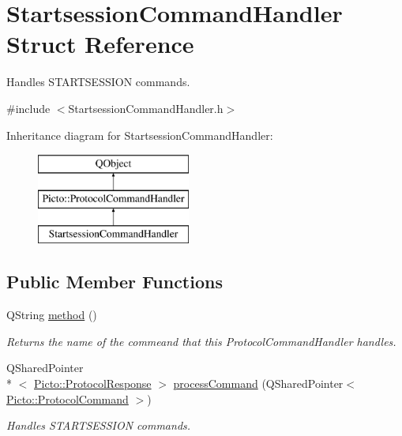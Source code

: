 \hypertarget{struct_startsession_command_handler}{\section{Startsession\-Command\-Handler Struct Reference}
\label{struct_startsession_command_handler}
}


Handles S\-T\-A\-R\-T\-S\-E\-S\-S\-I\-O\-N commands.  




{\ttfamily \#include $<$Startsession\-Command\-Handler.\-h$>$}

Inheritance diagram for Startsession\-Command\-Handler\-:\begin{figure}[H]
\begin{center}
\leavevmode
\includegraphics[height=3.000000cm]{struct_startsession_command_handler}
\end{center}
\end{figure}
\subsection*{Public Member Functions}
\begin{DoxyCompactItemize}
\item 
\hypertarget{struct_startsession_command_handler_ae2d0d17e407bc95fa1348d2d378ca924}{Q\-String \hyperlink{struct_startsession_command_handler_ae2d0d17e407bc95fa1348d2d378ca924}{method} ()}\label{struct_startsession_command_handler_ae2d0d17e407bc95fa1348d2d378ca924}

\begin{DoxyCompactList}\small\item\em Returns the name of the commeand that this Protocol\-Command\-Handler handles. \end{DoxyCompactList}\item 
Q\-Shared\-Pointer\\*
$<$ \hyperlink{struct_picto_1_1_protocol_response}{Picto\-::\-Protocol\-Response} $>$ \hyperlink{struct_startsession_command_handler_a72ab5c05a68c5f3300fb65f4deb64aff}{process\-Command} (Q\-Shared\-Pointer$<$ \hyperlink{struct_picto_1_1_protocol_command}{Picto\-::\-Protocol\-Command} $>$)
\begin{DoxyCompactList}\small\item\em Handles S\-T\-A\-R\-T\-S\-E\-S\-S\-I\-O\-N commands. \end{DoxyCompactList}\end{DoxyCompactItemize}


